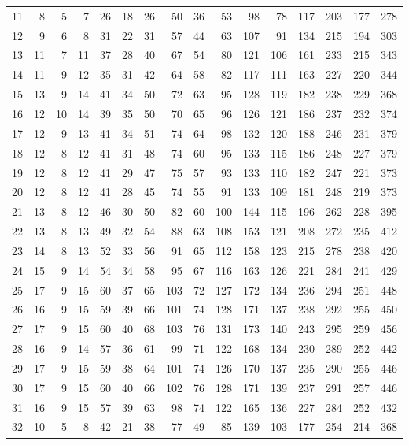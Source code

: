 \documentclass{article}
\begin{document}
\begin{longtable}{c *{3}{r} *{3}{r} *{3}{r} *{3}{r} *{3}{r}}
11 &  8 &  5 &  7 & 26 & 18 & 26 & 50 & 36 & 53 & 98 & 78 &117 & 203 & 177 & 278 \\
12 &  9 &  6 &  8 & 31 & 22 & 31 & 57 & 44 & 63 &107 & 91 &134 & 215 & 194 & 303 \\
13 & 11 &  7 & 11 & 37 & 28 & 40 & 67 & 54 & 80 &121 &106 &161 & 233 & 215 & 343 \\
14 & 11 &  9 & 12 & 35 & 31 & 42 & 64 & 58 & 82 &117 &111 &163 & 227 & 220 & 344 \\
15 & 13 &  9 & 14 & 41 & 34 & 50 & 72 & 63 & 95 &128 &119 &182 & 238 & 229 & 368 \\
16 & 12 & 10 & 14 & 39 & 35 & 50 & 70 & 65 & 96 &126 &121 &186 & 237 & 232 & 374 \\
17 & 12 &  9 & 13 & 41 & 34 & 51 & 74 & 64 & 98 &132 &120 &188 & 246 & 231 & 379 \\
18 & 12 &  8 & 12 & 41 & 31 & 48 & 74 & 60 & 95 &133 &115 &186 & 248 & 227 & 379 \\
19 & 12 &  8 & 12 & 41 & 29 & 47 & 75 & 57 & 93 &133 &110 &182 & 247 & 221 & 373 \\
20 & 12 &  8 & 12 & 41 & 28 & 45 & 74 & 55 & 91 &133 &109 &181 & 248 & 219 & 373 \\
21 & 13 &  8 & 12 & 46 & 30 & 50 & 82 & 60 &100 &144 &115 &196 & 262 & 228 & 395 \\
22 & 13 &  8 & 13 & 49 & 32 & 54 & 88 & 63 &108 &153 &121 &208 & 272 & 235 & 412 \\
23 & 14 &  8 & 13 & 52 & 33 & 56 & 91 & 65 &112 &158 &123 &215 & 278 & 238 & 420 \\
24 & 15 &  9 & 14 & 54 & 34 & 58 & 95 & 67 &116 &163 &126 &221 & 284 & 241 & 429 \\
25 & 17 &  9 & 15 & 60 & 37 & 65 &103 & 72 &127 &172 &134 &236 & 294 & 251 & 448 \\
26 & 16 &  9 & 15 & 59 & 39 & 66 &101 & 74 &128 &171 &137 &238 & 292 & 255 & 450 \\
27 & 17 &  9 & 15 & 60 & 40 & 68 &103 & 76 &131 &173 &140 &243 & 295 & 259 & 456 \\
28 & 16 &  9 & 14 & 57 & 36 & 61 & 99 & 71 &122 &168 &134 &230 & 289 & 252 & 442 \\
29 & 17 &  9 & 15 & 59 & 38 & 64 &101 & 74 &126 &170 &137 &235 & 290 & 255 & 446 \\
30 & 17 &  9 & 15 & 60 & 40 & 66 &102 & 76 &128 &171 &139 &237 & 291 & 257 & 446 \\
31 & 16 &  9 & 15 & 57 & 39 & 63 & 98 & 74 &122 &165 &136 &227 & 284 & 252 & 432 \\
32 & 10 &  5 &  8 & 42 & 21 & 38 & 77 & 49 & 85 &139 &103 &177 & 254 & 214 & 368 \\
\end{longtable}
\end{document}
